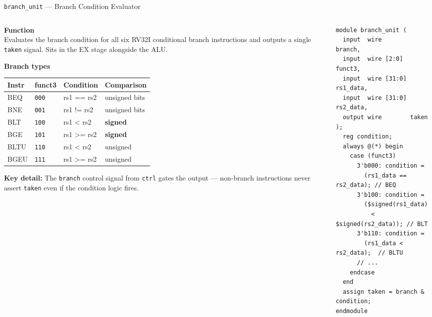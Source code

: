 \documentclass[aspectratio=169,10pt]{beamer}
\begin{document}
\begin{frame}[fragile]{\texttt{branch\_unit} --- Branch Condition Evaluator}
  \begin{columns}[T]
    \begin{column}{0.50\textwidth}
      \textbf{Function}\\
      Evaluates the branch condition for all six RV32I conditional branch instructions and outputs a single \texttt{taken} signal.
      Sits in the EX stage alongside the ALU.

      \vspace{0.5em}
      \textbf{Branch types}
      \renewcommand{\arraystretch}{1.2}
      \scriptsize
      \begin{tabular}{llll}
        \toprule
        Instr & funct3 & Condition & Comparison \\
        \midrule
        BEQ  & \texttt{000} & rs1 == rs2   & unsigned bits \\
        BNE  & \texttt{001} & rs1 != rs2   & unsigned bits \\
        BLT  & \texttt{100} & rs1 < rs2    & \textbf{signed} \\
        BGE  & \texttt{101} & rs1 >= rs2   & \textbf{signed} \\
        BLTU & \texttt{110} & rs1 < rs2    & unsigned \\
        BGEU & \texttt{111} & rs1 >= rs2   & unsigned \\
        \bottomrule
      \end{tabular}

      \vspace{0.5em}
      \small\textbf{Key detail:} The \texttt{branch} control signal from \texttt{ctrl} gates the output --- non-branch instructions never assert \texttt{taken} even if the condition logic fires.
    \end{column}
    \begin{column}{0.46\textwidth}
\begin{lstlisting}
module branch_unit (
  input  wire        branch,
  input  wire [2:0]  funct3,
  input  wire [31:0] rs1_data,
  input  wire [31:0] rs2_data,
  output wire        taken
);
  reg condition;
  always @(*) begin
    case (funct3)
      3'b000: condition =
        (rs1_data == rs2_data); // BEQ
      3'b100: condition =
        ($signed(rs1_data)
          < $signed(rs2_data)); // BLT
      3'b110: condition =
        (rs1_data < rs2_data);  // BLTU
      // ...
    endcase
  end
  assign taken = branch & condition;
endmodule
\end{lstlisting}
    \end{column}
  \end{columns}
\end{frame}
\end{document}
